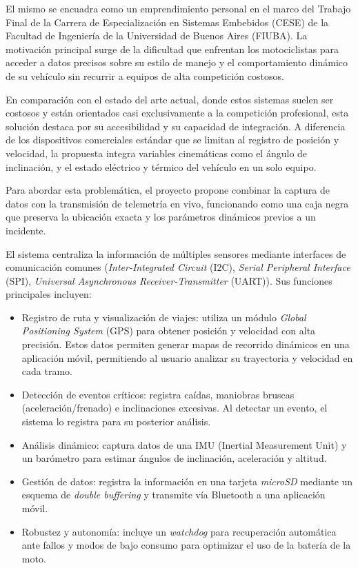 \documentclass[
11pt, %
]{charter}
\begin{document}
El mismo se encuadra como un emprendimiento personal en el marco del Trabajo Final de la Carrera de Especialización en Sistemas Embebidos (CESE) de la Facultad de Ingeniería de la Universidad de Buenos Aires (FIUBA). La motivación principal surge de la dificultad que enfrentan los motociclistas para acceder a datos precisos sobre su estilo de manejo y el comportamiento dinámico de su vehículo sin recurrir a equipos de alta competición costosos.

En comparación con el estado del arte actual, donde estos sistemas suelen ser costosos y están orientados casi exclusivamente a la competición profesional, esta solución destaca por su accesibilidad y su capacidad de integración. A diferencia de los dispositivos comerciales estándar que se limitan al registro de posición y velocidad, la propuesta integra variables cinemáticas como el ángulo de inclinación, y el estado eléctrico y térmico del vehículo en un solo equipo.

Para abordar esta problemática, el proyecto propone combinar la captura de datos con la transmisión de telemetría en vivo, funcionando como una caja negra que preserva la ubicación exacta y los parámetros dinámicos previos a un incidente.

El sistema centraliza la información de múltiples sensores mediante interfaces de comunicación comunes (\textit{Inter-Integrated Circuit} (I2C), \textit{Serial Peripheral Interface} (SPI), \textit{Universal Asynchronous Receiver-Transmitter} (UART)). Sus funciones principales incluyen:

\begin{itemize}
    \item Registro de ruta y visualización de viajes: utiliza un módulo \textit{Global Positioning System} (GPS) para obtener posición y velocidad con alta precisión. Estos datos permiten generar mapas de recorrido dinámicos en una aplicación móvil, permitiendo al usuario analizar su trayectoria y velocidad en cada tramo.
    \item Detección de eventos críticos: registra caídas, maniobras bruscas (aceleración/frenado) e inclinaciones excesivas. Al detectar un evento, el sistema lo registra para su posterior análisis.
    \item Análisis dinámico: captura datos de una IMU (Inertial Measurement Unit) y un barómetro para estimar ángulos de inclinación, aceleración y altitud.
    \item Gestión de datos: registra la información en una tarjeta \textit{microSD} mediante un esquema de \textit{double buffering} y transmite vía Bluetooth a una aplicación móvil.
    \item Robustez y autonomía: incluye un \textit{watchdog} para recuperación automática ante fallos y modos de bajo consumo para optimizar el uso de la batería de la moto.
\end{itemize}
\end{document}
